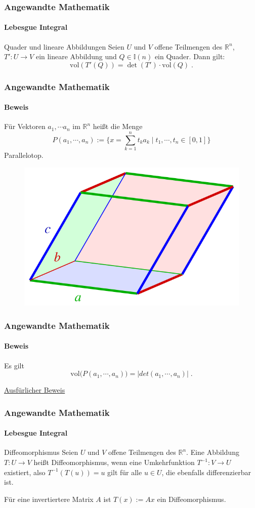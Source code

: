 \documentclass{beamer}
\begin{document}
\begin{frame}
    \frametitle{Angewandte Mathematik}
\framesubtitle{Lebesgue Integral}
\begin{block}{Quader und lineare Abbildungen}
Seien $U$ und $V$ offene Teilmengen des $\mathbb{R}^n$, $T': U \to V$ ein lineare Abbildung und  $Q \in \mathbb{I}(n)$ ein Quader.
Dann gilt:
 $$ \text{vol}  (T'(Q))   =  \det (T') \cdot   \text{vol}(Q) \; .$$
\end{block}
 \end{frame}

\begin{frame}
    \frametitle{Angewandte Mathematik}
\framesubtitle{Beweis}
Für Vektoren $a_1, \cdots a_n$ im $\mathbb{R}^n$ heißt die Menge 
$$ P(a_1, \cdots,  a_n) := \biggl \{  x = \sum_{k=1}^n t_k a_k  \; | \; t_1, \cdots , t_n \in [0,1]  \biggr \}$$
Parallelotop.
\begin{figure}[H]
      \centering
    \includegraphics[width=0.6 \textwidth]{images/640px-Parallelepiped-0}    
\end{figure}
 \end{frame}

\begin{frame}
    \frametitle{Angewandte Mathematik}
\framesubtitle{Beweis}

Es gilt  $$  \text{vol} \bigr( P(a_1, \cdots, a_n) \bigr) =  | det (a_1, \cdots, a_n) |   \; .$$

\href{https://www.math.uchicago.edu/~may/VIGRE/VIGRE2007/REUPapers/FINALAPP/Peng.pdf}{Ausfürlicher Beweis}
 \end{frame}



\begin{frame}
    \frametitle{Angewandte Mathematik}
\framesubtitle{Lebesgue Integral}
\begin{block}{Diffeomorphismus}
Seien $U$ und $V$ offene Teilmengen des $\mathbb{R}^n$. Eine Abbildung  $T: U \to V$ heißt Diffeomorphismus, wenn eine  Umkehrfunktion $T^{-1}: V  \to U$ existiert, also $T^{-1} (T (u)) = u$ gilt für alle $u \in U$, die ebenfalls differenzierbar ist.
\end{block}

\begin{block}{}
Für eine invertiertere Matrix $A$ ist $T(x):= Ax$ ein Diffeomorphismus.
\end{block}
 \end{frame}
\end{document}
